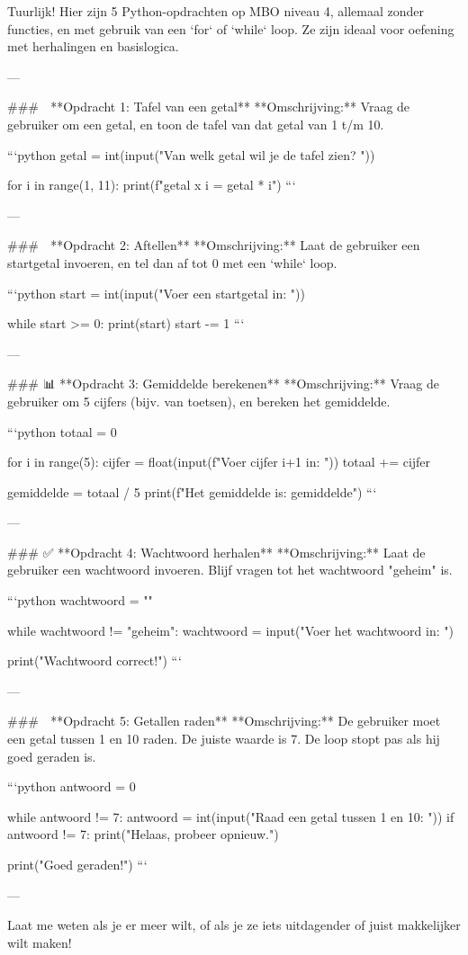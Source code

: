 Tuurlijk! Hier zijn 5 Python-opdrachten op MBO niveau 4, allemaal zonder functies, en met gebruik van een `for` of `while` loop. Ze zijn ideaal voor oefening met herhalingen en basislogica.

---

### 🐍 **Opdracht 1: Tafel van een getal**
**Omschrijving:** Vraag de gebruiker om een getal, en toon de tafel van dat getal van 1 t/m 10.

```python
getal = int(input("Van welk getal wil je de tafel zien? "))

for i in range(1, 11):
    print(f"{getal} x {i} = {getal * i}")
```

---

### 🔢 **Opdracht 2: Aftellen**
**Omschrijving:** Laat de gebruiker een startgetal invoeren, en tel dan af tot 0 met een `while` loop.

```python
start = int(input("Voer een startgetal in: "))

while start >= 0:
    print(start)
    start -= 1
```

---

### 📊 **Opdracht 3: Gemiddelde berekenen**
**Omschrijving:** Vraag de gebruiker om 5 cijfers (bijv. van toetsen), en bereken het gemiddelde.

```python
totaal = 0

for i in range(5):
    cijfer = float(input(f"Voer cijfer {i+1} in: "))
    totaal += cijfer

gemiddelde = totaal / 5
print(f"Het gemiddelde is: {gemiddelde}")
```

---

### ✅ **Opdracht 4: Wachtwoord herhalen**
**Omschrijving:** Laat de gebruiker een wachtwoord invoeren. Blijf vragen tot het wachtwoord "geheim" is.

```python
wachtwoord = ""

while wachtwoord != "geheim":
    wachtwoord = input("Voer het wachtwoord in: ")

print("Wachtwoord correct!")
```

---

### 🎲 **Opdracht 5: Getallen raden**
**Omschrijving:** De gebruiker moet een getal tussen 1 en 10 raden. De juiste waarde is 7. De loop stopt pas als hij goed geraden is.

```python
antwoord = 0

while antwoord != 7:
    antwoord = int(input("Raad een getal tussen 1 en 10: "))
    if antwoord != 7:
        print("Helaas, probeer opnieuw.")

print("Goed geraden!")
```

---

Laat me weten als je er meer wilt, of als je ze iets uitdagender of juist makkelijker wilt maken!
